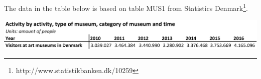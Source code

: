 The data in the table below is based on table MUS1 from Statistics Denmark\footnote{http://www.statistikbanken.dk/10259}.

\begin{center}
\includegraphics[width=16cm]{Appendix/VisitorsArtMuseums.png}
\end{center}